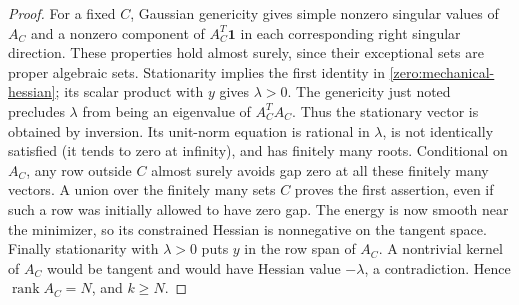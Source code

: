 \documentclass[11pt,a4paper]{article}
\numberwithin{equation}{section}
\theoremstyle{definition}
\theoremstyle{remark}
\begin{document}
\begin{proof}
For a fixed \(C\), Gaussian genericity gives simple nonzero singular
values of \(A_C\) and a nonzero component of \(A_C^T\mathbf1\) in
each corresponding right singular direction.  These properties hold
almost surely, since their exceptional sets are proper algebraic
sets.  Stationarity implies the first identity in
\eqref{zero:mechanical-hessian}; its scalar product with \(y\) gives
\(\lambda>0\).  The genericity just noted precludes \(\lambda\)
from being an eigenvalue of \(A_C^TA_C\).  Thus the stationary vector
is obtained by inversion.  Its unit-norm equation is rational in
\(\lambda\), is not identically satisfied (it tends to zero at
infinity), and has finitely many roots.  Conditional on \(A_C\),
any row outside \(C\) almost surely avoids gap zero at all these
finitely many vectors.  A union over the finitely many sets \(C\)
proves the first assertion, even if such a row was initially allowed
to have zero gap.  The energy is now smooth near the minimizer, so
its constrained Hessian is nonnegative on the tangent space.
Finally stationarity with \(\lambda>0\) puts \(y\) in the row span
of \(A_C\).  A nontrivial kernel of \(A_C\) would be tangent and
would have Hessian value \(-\lambda\), a contradiction.  Hence
\(\operatorname{rank} A_C=N\), and \(k\ge N\).
\end{proof}
\end{document}
